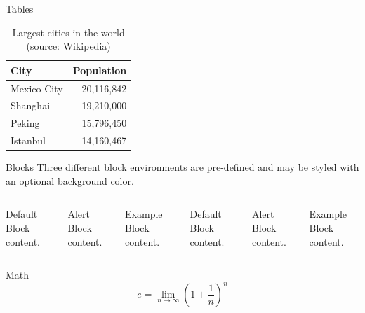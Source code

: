\documentclass[10pt]{ctexbeamer}
\begin{document}
\begin{frame}{Tables}
  \begin{table}
    \caption{Largest cities in the world (source: Wikipedia)}
    \begin{tabular}{@{} lr @{}}
      \toprule
      City & Population\\
      \midrule
      Mexico City & 20,116,842\\
      Shanghai & 19,210,000\\
      Peking & 15,796,450\\
      Istanbul & 14,160,467\\
      \bottomrule
    \end{tabular}
  \end{table}
\end{frame}
\begin{frame}{Blocks}
  Three different block environments are pre-defined and may be styled with an
  optional background color.

  \begin{columns}[T,onlytextwidth]
      \begin{block}{Default}
        Block content.
      \end{block}

      \begin{alertblock}{Alert}
        Block content.
      \end{alertblock}

      \begin{exampleblock}{Example}
        Block content.
      \end{exampleblock}



      \begin{block}{Default}
        Block content.
      \end{block}

      \begin{alertblock}{Alert}
        Block content.
      \end{alertblock}

      \begin{exampleblock}{Example}
        Block content.
      \end{exampleblock}

  \end{columns}
\end{frame}
\begin{frame}{Math}
  \begin{equation*}
e=\lim_{n\to\infty}\left(1+\frac{1}{n}\right)^n
\end{equation*}
\end{frame}
\end{document}
